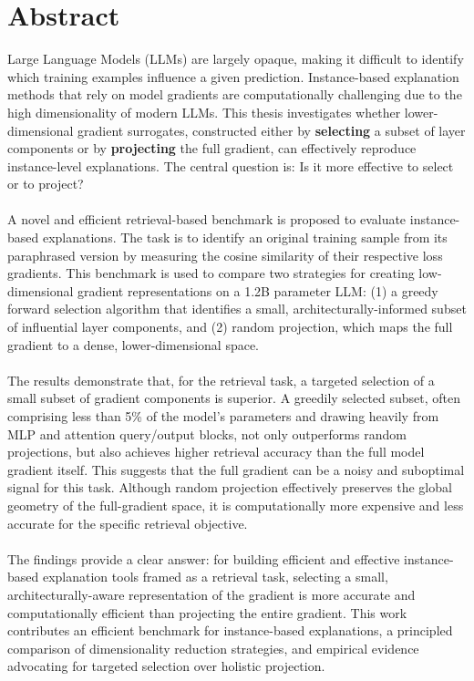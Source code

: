 \chapter{Abstract}
Large Language Models (LLMs) are largely opaque, making it difficult to identify which training examples influence a given prediction. Instance-based explanation methods that rely on model gradients are computationally challenging due to the high dimensionality of modern LLMs. This thesis investigates whether lower-dimensional gradient surrogates, constructed either by \textbf{selecting} a subset of layer components or by \textbf{projecting} the full gradient, can effectively reproduce instance-level explanations. The central question is: Is it more effective to select or to project?
\\\\
A novel and efficient retrieval-based benchmark is proposed to evaluate instance-based explanations. The task is to identify an original training sample from its paraphrased version by measuring the cosine similarity of their respective loss gradients. This benchmark is used to compare two strategies for creating low-dimensional gradient representations on a 1.2B parameter LLM: (1) a greedy forward selection algorithm that identifies a small, architecturally-informed subset of influential layer components, and (2) random projection, which maps the full gradient to a dense, lower-dimensional space.
\\\\
The results demonstrate that, for the retrieval task, a targeted selection of a small subset of gradient components is superior. A greedily selected subset, often comprising less than 5\% of the model's parameters and drawing heavily from MLP and attention query/output blocks, not only outperforms random projections, but also achieves higher retrieval accuracy than the full model gradient itself. This suggests that the full gradient can be a noisy and suboptimal signal for this task. Although random projection effectively preserves the global geometry of the full-gradient space, it is computationally more expensive and less accurate for the specific retrieval objective.
\\\\
The findings provide a clear answer: for building efficient and effective instance-based explanation tools framed as a retrieval task, selecting a small, architecturally-aware representation of the gradient is more accurate and computationally efficient than projecting the entire gradient. This work contributes an efficient benchmark for instance-based explanations, a principled comparison of dimensionality reduction strategies, and empirical evidence advocating for targeted selection over holistic projection.